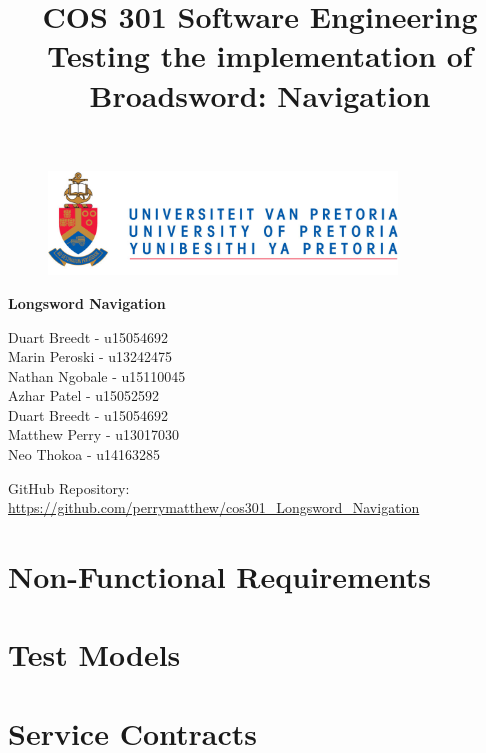 \documentclass{article}
\begin{document}
		\begin{figure}[t]
			\centering
			\includegraphics[width=350px]{UP_Logo.PNG}
		\end{figure}
			\title{COS 301 Software Engineering\\ Testing the implementation of Broadsword: Navigation}
\maketitle
		\begin{center}
			\textbf{\newline Longsword Navigation} \\
		\end{center}
				
		\begin{flushright} \large
			Duart Breedt - u15054692\\			
			Marin Peroski - u13242475\\
			Nathan Ngobale -  u15110045\\
			Azhar Patel - u15052592\\
			Duart Breedt - u15054692\\
			Matthew Perry - u13017030\\
			Neo Thokoa - u14163285\\
		\end{flushright}
		
		GitHub Repository: \href{https://github.com/perrymatthew/cos301_Longsword_Navigation}\\
		\url{https://github.com/perrymatthew/cos301_Longsword_Navigation}

\clearpage
\tableofcontents
\clearpage

\section{Non-Functional Requirements}
	
\clearpage
	
\section{Test Models}
	
\clearpage

\section{Service Contracts}
	
\end{document}
